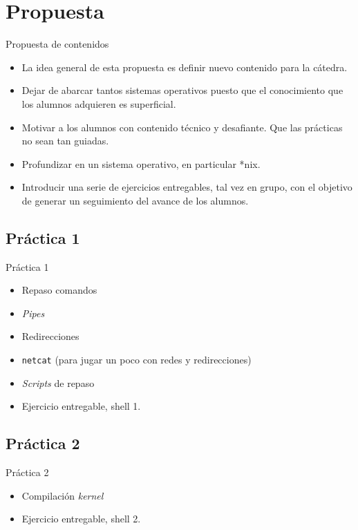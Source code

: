 \section{Propuesta}

\begin{frame}{Propuesta de contenidos}
  \begin{itemize}
  \item La idea general de esta propuesta es definir nuevo contenido para
    la cátedra.
    
  \item Dejar de abarcar tantos sistemas operativos puesto que el
    conocimiento que los alumnos adquieren es superficial.
    
  \item Motivar a los alumnos con contenido técnico y desafiante. Que las
    prácticas no sean tan guiadas.
    
  \item Profundizar en un sistema operativo, en particular *nix.
    
  \item Introducir una serie de ejercicios entregables, tal vez en grupo,
    con el objetivo de generar un seguimiento del avance de los alumnos.
    
\end{itemize}
\end{frame}

\subsection{Práctica 1}
\begin{frame}{Práctica 1}
\begin{itemize}
\item Repaso comandos
\item \textit{Pipes}
\item Redirecciones
\item \texttt{netcat} (para jugar un poco con redes y redirecciones)
\item \textit{Scripts} de repaso
\item Ejercicio entregable, shell 1.
\end{itemize}
\end{frame}

\subsection{Práctica 2}
\begin{frame}{Práctica 2}
\begin{itemize}
\item Compilación \textit{kernel}
\item Ejercicio entregable, shell 2.
\end{itemize}
\end{frame}

